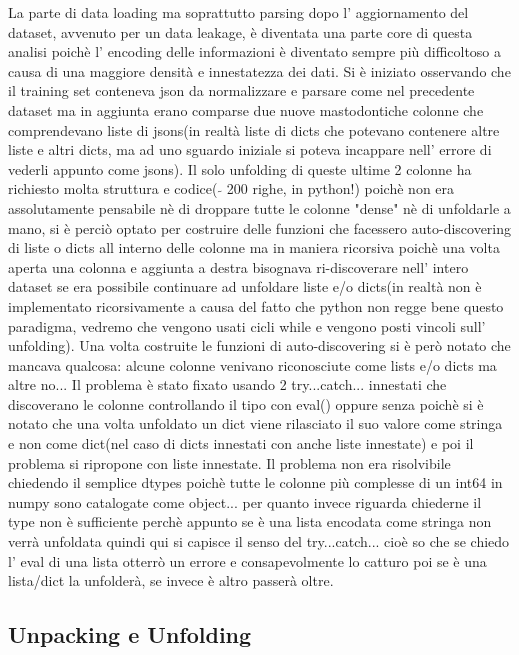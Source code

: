 \documentclass[11pt]{article}
\begin{document}
La parte di data loading ma soprattutto parsing dopo l' aggiornamento
del dataset, avvenuto per un data leakage, è diventata una parte core di
questa analisi poichè l' encoding delle informazioni è diventato sempre
più difficoltoso a causa di una maggiore densità e innestatezza dei
dati. Si è iniziato osservando che il training set conteneva json da
normalizzare e parsare come nel precedente dataset ma in aggiunta erano
comparse due nuove mastodontiche colonne che comprendevano liste di
jsons(in realtà liste di dicts che potevano contenere altre liste e
altri dicts, ma ad uno sguardo iniziale si poteva incappare nell' errore
di vederli appunto come jsons). Il solo unfolding di queste ultime 2
colonne ha richiesto molta struttura e codice( \(\tilde{}\) 200 righe,
in python!) poichè non era assolutamente pensabile nè di droppare tutte
le colonne "dense" nè di unfoldarle a mano, si è perciò optato per
costruire delle funzioni che facessero auto-discovering di liste o dicts
all interno delle colonne ma in maniera ricorsiva poichè una volta
aperta una colonna e aggiunta a destra bisognava ri-discoverare nell'
intero dataset se era possibile continuare ad unfoldare liste e/o
dicts(in realtà non è implementato ricorsivamente a causa del fatto che
python non regge bene questo paradigma, vedremo che vengono usati cicli
while e vengono posti vincoli sull' unfolding). Una volta costruite le
funzioni di auto-discovering si è però notato che mancava qualcosa:
alcune colonne venivano riconosciute come lists e/o dicts ma altre no...
Il problema è stato fixato usando 2 try...catch... innestati che
discoverano le colonne controllando il tipo con eval() oppure senza
poichè si è notato che una volta unfoldato un dict viene rilasciato il
suo valore come stringa e non come dict(nel caso di dicts innestati con
anche liste innestate) e poi il problema si ripropone con liste
innestate. Il problema non era risolvibile chiedendo il semplice dtypes
poichè tutte le colonne più complesse di un int64 in numpy sono
catalogate come object... per quanto invece riguarda chiederne il type
non è sufficiente perchè appunto se è una lista encodata come stringa
non verrà unfoldata quindi qui si capisce il senso del try...catch...
cioè so che se chiedo l' eval di una lista otterrò un errore e
consapevolmente lo catturo poi se è una lista/dict la unfolderà, se
invece è altro passerà oltre.

\subsection{Unpacking e Unfolding}\label{unpacking-e-unfolding}
\end{document}
